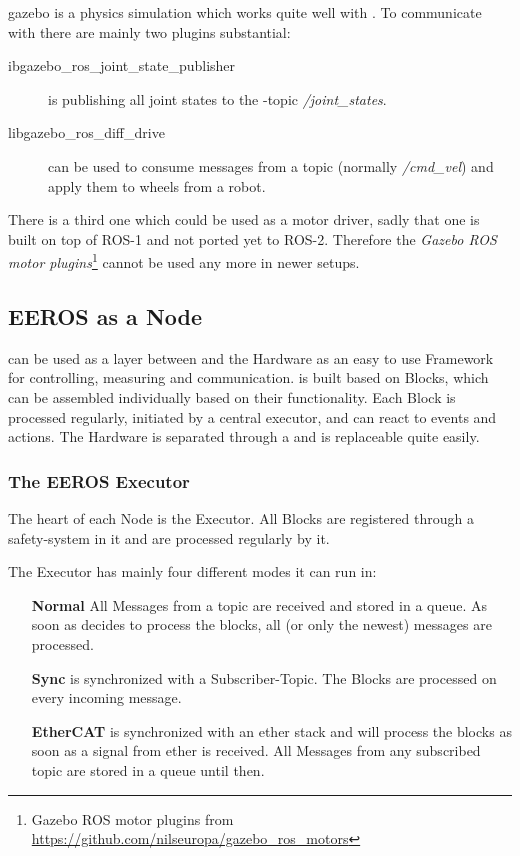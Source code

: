 \Gls{gazebo} is a physics simulation which works quite well with .
To communicate with  there are mainly two plugins substantial:

\begin{description}
    \item[ibgazebo\_ros\_joint\_state\_publisher] is publishing all joint states to the -\Gls{topic} \textit{/joint\_states}.
    \item[libgazebo\_ros\_diff\_drive] can be used to consume messages from a topic (normally \textit{/cmd\_vel}) and apply them to wheels from a robot.
\end{description}

There is a third one which could be used as a motor driver, sadly that one is built on top of ROS-1 and not ported yet to ROS-2.
Therefore the \textit{Gazebo ROS motor plugins}\footnote{Gazebo ROS motor plugins from \url{https://github.com/nilseuropa/gazebo_ros_motors}} cannot be used any more in newer setups.


\subsection[EEROS]{EEROS as a Node} \label{sec:eeros-node}

 can be used as a layer between  and the Hardware as an easy to use Framework for controlling, measuring and communication.
 is built based on Blocks, which can be assembled individually based on their functionality.
Each Block is processed regularly, initiated by a central executor, and can react to events and actions.
The Hardware is separated through a  and is replaceable quite easily.

\subsubsection[EEROS Executor]{The EEROS Executor} \label{sec:eeros-executor}

The heart of each  Node is the Executor. All Blocks are registered through a safety-system in it and are processed regularly by it.

The Executor has mainly four different modes it can run in:

\begin{itemize}
    \item[\textbf{Normal}] All Messages from a \Gls{topic} are received and stored in a queue. As soon as  decides to process the blocks, all (or only the newest) messages are processed.
    \item[\textbf{Sync}]  is synchronized with a Subscriber-Topic. The Blocks are processed on every incoming message.
    \item[\textbf{EtherCAT}]  is synchronized with an \Gls{ether} stack and will process the blocks as soon as a signal from \Gls{ether} is received. All Messages from any subscribed \gls{topic} are stored in a queue until then.
\end{itemize}


